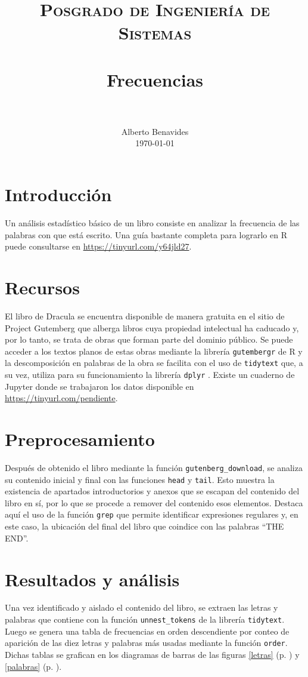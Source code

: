 \documentclass[paper=leter, fontsize=11pt]{scrartcl}
\title{
		\usefont{OT1}{bch}{b}{n}
		\normalfont \normalsize \textsc{Posgrado de Ingeniería de Sistemas} \\ [25pt]
		\horrule{0.5pt} \\[0.4cm]
		\huge Frecuencias \\
		\horrule{2pt} \\[0.5cm]
}
\author{
		\normalfont 								\normalsize
        Alberto Benavides\\[-3pt]		\normalsize
        \today
}
\date{}
\numberwithin{equation}{section}		%
\numberwithin{figure}{section}			%
\numberwithin{table}{section}				%
\begin{document}
\maketitle

\section{Introducción}

Un análisis estadístico básico de un libro consiste en analizar la frecuencia de las palabras con que está escrito. Una guía bastante completa para lograrlo en R \cite{r} puede consultarse en \url{https://tinyurl.com/y64jld27}.

\section{Recursos}

El libro de Dracula \cite{dracula} se encuentra disponible de manera gratuita en el sitio de Project Gutemberg que alberga libros cuya propiedad intelectual ha caducado y, por lo tanto, se trata de obras que forman parte del dominio público. Se puede acceder a los textos planos de estas obras mediante la librería \texttt{gutembergr} \cite{gutenbergr} de R y la descomposición en palabras de la obra se facilita con el uso de \texttt{tidytext} \cite{tidytext} que, a su vez, utiliza para su funcionamiento la librería \texttt{dplyr} \cite{dplyr}. Existe un cuaderno de Jupyter \cite{jupyter} donde se trabajaron los datos disponible en \url{https://tinyurl.com/pendiente}.

\section{Preprocesamiento}
Después de obtenido el libro mediante la función \texttt{gutenberg\_download}, se analiza su contenido inicial y final con las funciones \texttt{head} y \texttt{tail}. Esto muestra la existencia de apartados introductorios y anexos que se escapan del contenido del libro en sí, por lo que se procede a remover del contenido esos elementos. Destaca aquí el uso de la función \texttt{grep} que permite identificar expresiones regulares y, en este caso, la ubicación del final del libro que coindice con las palabras ``THE END''.

\section{Resultados y análisis}
Una vez identificado y aislado el contenido del libro, se extraen las letras y palabras que contiene con la función \texttt{unnest\_tokens} de la librería \texttt{tidytext}. Luego se genera una tabla de frecuencias en orden descendiente por conteo de aparición de las diez letras y palabras más usadas mediante la función \texttt{order}. Dichas tablas se grafican en los diagramas de barras de las figuras \ref{letras} (p. \pageref{letras}) y \ref{palabras} (p. \pageref{palabras}).
\end{document}
